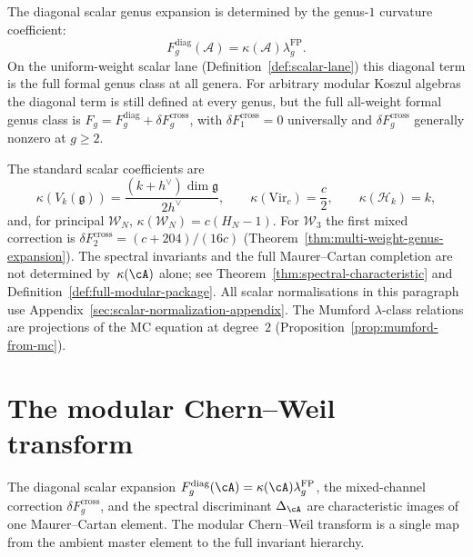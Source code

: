 \begin{remark}\label{rem:finite-data-genus}
The diagonal scalar genus expansion is determined by the genus-$1$
curvature coefficient:
\[
F_g^{\mathrm{diag}}(\mathcal{A})
=\kappa(\mathcal{A})\lambda_g^{\mathrm{FP}}.
\]
On the uniform-weight scalar lane
(Definition~\ref{def:scalar-lane}) this diagonal term is the full
formal genus class at all genera. For arbitrary modular Koszul algebras the
diagonal term is still defined at every genus, but the full
all-weight formal genus class is
$F_g=F_g^{\mathrm{diag}}+\delta F_g^{\mathrm{cross}}$, with
$\delta F_1^{\mathrm{cross}}=0$ universally and
$\delta F_g^{\mathrm{cross}}$ generally nonzero at $g\geq2$.

The standard scalar coefficients are
\[
\kappa(V_k(\mathfrak{g}))
=\frac{(k+h^\vee)\dim\mathfrak{g}}{2h^\vee},
\qquad
\kappa(\mathrm{Vir}_c)=\frac{c}{2},
\qquad
\kappa(\mathcal{H}_k)=k,
\]
and, for principal $\mathcal{W}_N$,
$\kappa(\mathcal{W}_N)=c(H_N-1)$.  For $\mathcal{W}_3$ the first
mixed correction is
$\delta F_2^{\mathrm{cross}}=(c+204)/(16c)$
(Theorem~\ref{thm:multi-weight-genus-expansion}). The spectral
invariants and the full Maurer--Cartan completion are not determined
by~$\kappa(\cA)$ alone; see Theorem~\ref{thm:spectral-characteristic}
and Definition~\ref{def:full-modular-package}.
All scalar normalisations in this paragraph use
Appendix~\ref{sec:scalar-normalization-appendix}.
The Mumford $\lambda$-class relations are projections of the MC equation at degree~$2$ (Proposition~\ref{prop:mumford-from-mc}).
\end{remark}



\section{The modular Chern--Weil transform}
\label{sec:modular-chern-weil-transform}

The diagonal scalar expansion
$F_g^{\mathrm{diag}}(\cA)=\kappa(\cA)\lambda_g^{\mathrm{FP}}$, the
mixed-channel correction $\delta F_g^{\mathrm{cross}}$, and the
spectral discriminant $\Delta_{\cA}$ are characteristic images of one
Maurer--Cartan element. The modular Chern--Weil transform is a single
map from the ambient master element to the full invariant hierarchy.

